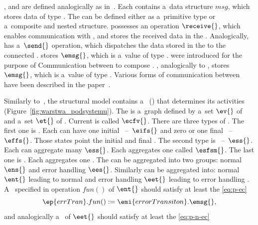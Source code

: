 \documentclass[11pt,oneside,a4paper]{article}
\newcommand{\Figure}[0]{Figure}
\begin{document}
	\Ib{}, \Ob{} and \Mb{} are defined analogically as in~\cite{Trojanek:phd2012}.
	Each \Buffer{} contains a~data structure $msg$, which stores data of type \ValueType{}.
	The \ValueType{} can be defined either as a~primitive type or a~composite and nested structure.
	\InputBuffer{} possesses an operation $\receive{}$, which enables communication with \OutputBuffers{}, and stores the received data in the \InputBuffer{}.
	Analogically, \OutputBuffer{} has a~$\send{}$ operation, which dispatches the data stored in the \OutputBuffer{} to the connected \InputBuffers{}.
	\InternalMemory{} stores $\emsg{}$,	which is a~value of type \ValueType{}. \TransitionFunctionCompositionVariables{} were introduced for the purpose of Communication between \PrimitiveTransitionFunctions{} to compose \TransitionFunction{}. \TransitionFunctionCompositionVariable{}, analogically to \InternalMemory{}, stores $\emsg{}$, which is a~value of type \ValueType{}. 
	Various forms of communication between \Subsystems{} have been described in the paper~\cite{hexel-jint2019}.
	
	Similarly to~\cite{robotml,Kornuta:13_irs}, the \EARL{} \Subsystem{} structural model contains a~\FiniteStateMachine{} (\Fsm{}) that determines its
	activities (\Figure{}~\ref{fig:warstwa_podsystemu}). The \Fsm{} is a~graph defined by a~set $\ev{}$ of \FsmVertices{} and a~set $\et{}$ of \FsmTransitions{}. Current \FsmVertex{} is called $\ecfv{}$. There are three types of \FsmVertices{}. The first one is \FsmPseudostate. Each \Fsm{} can have one initial \FsmState~--~$\eifs{}$ and zero or one final \FsmState{}~--~$\effs{}$. Those states point the initial and final \FsmVertex{}. The second type is \FsmSuperstate{}~--~$\ess{}$. Each \Fsm{} can aggregate many $\ess{}$. Each \FsmSuperstate{} aggregates one \Fsm{} called $\esfsm{}$. The last one is \FsmState{}. Each \FsmState{} aggregates one \BasicBehaviour{}. The \FsmStates{} can be aggregated into two groups: normal \FsmStates{} $\ens{}$ and error handling \FsmStates{} $\ees{}$. Similarly \FsmTransitions{} can be aggregated into: normal \FsmTransitions{} $\ent{}$ leading to normal \FsmStates{} and error handling \FsmTransitions{} $\eet{}$ leading to error handling \FsmStates{}. A~\Predicate{} specified in operation $fun()$ of \FsmTransitions{} $\ent{}$ should satisfy at least the \Predicate{} \eqref{eq:p-ec}
		\begin{equation}
		\ep{errTran}.fun() := \emi{errorTransiton}.\emsg{},
		\label{eq:p-ec}
	\end{equation}	
	 and analogically a~\Predicate{} of \FsmTransitions{} $\eet{}$ should satisfy at least the \Predicate{} \eqref{eq:p-n-ec}
	
\end{document}
